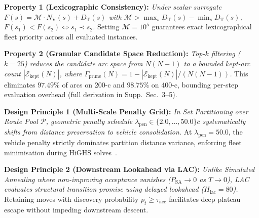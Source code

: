 \documentclass{ieeeaccess}
\newcommand{\NV}{{N_\mathrm{V}}}
\newcommand{\TD}{{D_\mathrm{T}}}
\begin{document}
\noindent\textbf{Property 1 (Lexicographic Consistency):} \textit{Under scalar surrogate $F(s) = \mathcal{M} \cdot \NV(s) + \TD(s)$ with $\mathcal{M} > \max_{s} \TD(s) - \min_{s} \TD(s)$, $F(s_1) < F(s_2) \iff s_1 \prec s_2$.} Setting $\mathcal{M} = 10^5$ guarantees exact lexicographical fleet priority across all evaluated instances.

\noindent\textbf{Property 2 (Granular Candidate Space Reduction):} \textit{Top-$k$ filtering ($k=25$) reduces the candidate arc space from $N(N-1)$ to a bounded kept-arc count $|\mathcal{E}_{\text{kept}}(N)|$, where $\Gamma_{\text{prune}}(N) = 1 - |\mathcal{E}_{\text{kept}}(N)|/(N(N-1))$.}
This eliminates $97.49\%$ of arcs on 200-c and $98.75\%$ on 400-c, bounding per-step evaluation overhead (full derivation in Supp.\ Sec.~3--5).

\noindent\textbf{Design Principle 1 (Multi-Scale Penalty Grid):} \textit{In Set Partitioning over Route Pool $\mathcal{P}$, geometric penalty schedule $\lambda_{\text{pen}} \in \{2.0, \dots, 50.0\}\bar{c}$ systematically shifts from distance preservation to vehicle consolidation.} At $\lambda_{\text{pen}}=50.0$, the vehicle penalty strictly dominates partition distance variance, enforcing fleet minimisation during HiGHS solves~\cite{huangfu2018parallelizing}.

\noindent\textbf{Design Principle 2 (Downstream Lookahead via LAC):} \textit{Unlike Simulated Annealing where non-improving acceptance vanishes ($P_{\text{SA}} \to 0$ as $T \to 0$), LAC evaluates structural transition promise using delayed lookahead ($H_{\text{lac}} = 80$).} Retaining moves with discovery probability $p_t \ge \tau_{\text{acc}}$ facilitates deep plateau escape without impeding downstream descent.
\end{document}
